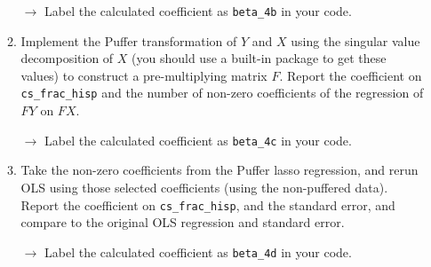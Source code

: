 \documentclass[11pt, a4paper]{article}
\begin{document}
\begin{enumerate}
\begin{enumerate}
  \hspace{10pt} $\rightarrow$ Label the calculated coefficient as \texttt{beta\_4b} in your code.
  \item Implement the Puffer transformation of $Y$ and $X$
    using the singular value decomposition of $X$ (you should use a
    built-in package to get these values) to construct a
    pre-multiplying matrix $F$. Report the coefficient on
    \texttt{cs\_frac\_hisp} and the number of non-zero coefficients of
    the regression of $FY$ on $FX$.

    \hspace{10pt} $\rightarrow$ Label the calculated coefficient as \texttt{beta\_4c} in your code.
  \item Take the non-zero coefficients from the Puffer lasso
    regression, and rerun OLS using those selected coefficients (using
    the non-puffered data). Report the coefficient on
    \texttt{cs\_frac\_hisp}, and the standard error, and compare to the
    original OLS regression and standard error.

    \hspace{10pt} $\rightarrow$ Label the calculated coefficient as \texttt{beta\_4d} in your code.
  \end{enumerate}
\end{enumerate}
\end{document}

